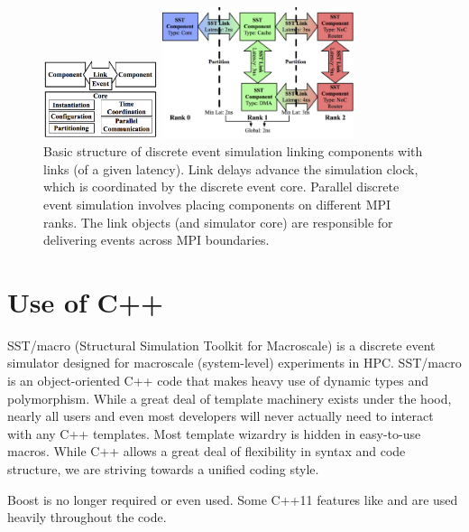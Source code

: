 \begin{figure}
\centering
\includegraphics[width=0.3\textwidth]{figures/desCore.png}

\includegraphics[width=0.5\textwidth]{figures/pdesCore.png}
\caption{Basic structure of discrete event simulation linking components with links (of a given latency). Link delays advance the simulation clock, which is coordinated by the discrete event core. Parallel discrete event simulation involves placing components on different MPI ranks. The link objects (and simulator core) are responsible for delivering events across MPI boundaries.}
\label{fig:desCore}
\end{figure}

\section{Use of C++}
\label{sec:useCpp}

SST/macro (Structural Simulation Toolkit for Macroscale) is a discrete event simulator designed for macroscale (system-level) experiments in HPC. 
SST/macro is an object-oriented C++ code that makes heavy use of dynamic types and polymorphism.
While a great deal of template machinery exists under the hood, nearly all users and even most developers will never actually need to interact with any C++ templates.
Most template wizardry is hidden in easy-to-use macros.
While C++ allows a great deal of flexibility in syntax and code structure, we are striving towards a unified coding style.

Boost is no longer required or even used.
Some C++11 features like  and  are used heavily throughout the code.


